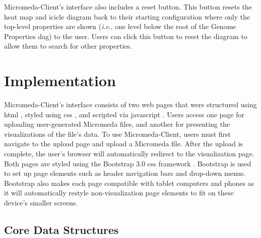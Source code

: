 Micromeda-Client's interface also includes a reset button. This button resets 
the heat map and icicle diagram back to their starting configuration where only 
the top-level properties are shown (\textit{i}.\textit{e}., one level below the 
root of the Genome Properties \gls{dag}) to the user. Users can click this button 
to reset the diagram to allow them to search for other properties.

\section{Implementation} \label{client-implementation}

Micromeda-Client's interface consists of two web pages that were structured 
using \gls{html} \cite{HTML5}, styled using \gls{css} \cite{CSS3}, and scripted 
via \gls{javascript} \cite{flanagan2006javascript}. Users access one page for 
uploading user-generated Micromeda files, and another for presenting the 
visualizations of the file's data. To use Micromeda-Client, users must first 
navigate to the upload page and upload a Micromeda file. After the upload is 
complete, the user's browser will automatically redirect to the visualization 
page. Both pages are styled using the Bootstrap 3.0 \gls{css} framework 
\cite{spurlock2013bootstrap}. Bootstrap is used to set up page elements such as 
header navigation bars and drop-down menus. Bootstrap also makes each page 
compatible with tablet computers and phones as it will automatically restyle 
non-visualization page elements to fit on these device's smaller screens.

\subsection{Core Data Structures} \label{visual-data-structures}

